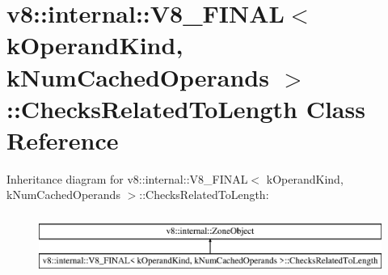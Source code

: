 \hypertarget{classv8_1_1internal_1_1_v8___f_i_n_a_l_1_1_checks_related_to_length}{}\section{v8\+:\+:internal\+:\+:V8\+\_\+\+F\+I\+N\+A\+L$<$ k\+Operand\+Kind, k\+Num\+Cached\+Operands $>$\+:\+:Checks\+Related\+To\+Length Class Reference}
\label{classv8_1_1internal_1_1_v8___f_i_n_a_l_1_1_checks_related_to_length}
Inheritance diagram for v8\+:\+:internal\+:\+:V8\+\_\+\+F\+I\+N\+A\+L$<$ k\+Operand\+Kind, k\+Num\+Cached\+Operands $>$\+:\+:Checks\+Related\+To\+Length\+:\begin{figure}[H]
\begin{center}
\leavevmode
\includegraphics[height=2.000000cm]{classv8_1_1internal_1_1_v8___f_i_n_a_l_1_1_checks_related_to_length}
\end{center}
\end{figure}
